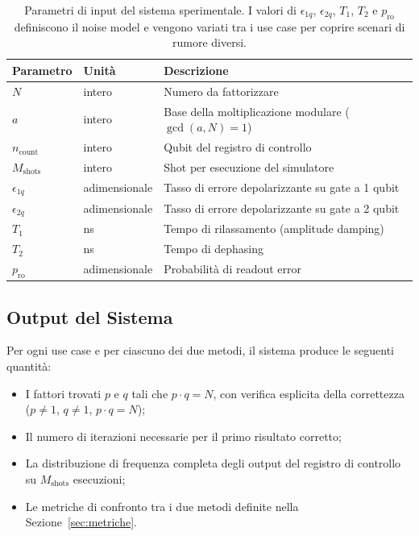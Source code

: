 \begin{onehalfspace}
\begin{table}[H]
\centering
\begin{tabular}{@{}lll@{}}
\toprule
\textbf{Parametro}  & \textbf{Unità} & \textbf{Descrizione} \\
\midrule
$N$                 & intero         & Numero da fattorizzare \\
$a$                 & intero         & Base della moltiplicazione modulare ($\gcd(a,N)=1$) \\
$n_{\text{count}}$  & intero         & Qubit del registro di controllo \\
$M_{\text{shots}}$  & intero         & Shot per esecuzione del simulatore \\
$\epsilon_{1q}$     & adimensionale  & Tasso di errore depolarizzante su gate a 1 qubit \\
$\epsilon_{2q}$     & adimensionale  & Tasso di errore depolarizzante su gate a 2 qubit \\
$T_1$               & ns             & Tempo di rilassamento (amplitude damping) \\
$T_2$               & ns             & Tempo di dephasing \\
$p_{\text{ro}}$     & adimensionale  & Probabilità di readout error \\
\bottomrule
\end{tabular}
\caption{Parametri di input del sistema sperimentale. I valori di $\epsilon_{1q}$, $\epsilon_{2q}$, $T_1$, $T_2$ e $p_{\text{ro}}$ definiscono il noise model e vengono variati tra i use case per coprire scenari di rumore diversi.}
\label{tab:input_params}
\end{table}

\subsection{Output del Sistema}

Per ogni use case e per ciascuno dei due metodi, il sistema produce le seguenti quantità:

\begin{itemize}
    \item I fattori trovati $p$ e $q$ tali che $p \cdot q = N$, con verifica esplicita della correttezza ($p \neq 1$, $q \neq 1$, $p \cdot q = N$);
    \item Il numero di iterazioni necessarie per il primo risultato corretto;
    \item La distribuzione di frequenza completa degli output del registro di controllo su $M_{\text{shots}}$ esecuzioni;
    \item Le metriche di confronto tra i due metodi definite nella Sezione~\ref{sec:metriche}.
\end{itemize}


\end{onehalfspace}
